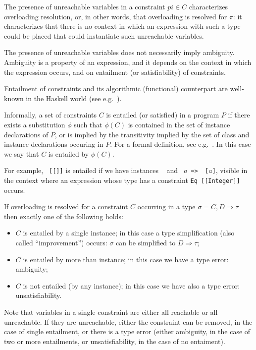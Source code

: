 The presence of unreachable variables in a constraint $pi\in C$
characterizes overloading resolution, or, in other words, that
overloading is resolved for $\pi$: it characterizes that there is no
context in which an expression with such a type could be placed that
could instantiate such unreachable variables.

The presence of unreachable variables does not necessarily imply
ambiguity. Ambiguity is a property of an expression, and it depends on
the context in which the expression occurs, and on entailment (or
satisfiability) of constraints.

Entailment of constraints and its algorithmic (functional) counterpart
are well-known in the Haskell world (see
e.g.~\cite{MarkJones94a,TheoryOfOverloading,JBCS-Ambiguity-and-constrained-polymorphism}).

Informally, a set of constraints $C$ is entailed (or satisfied) in a
program $P$ if there exists a substitution $\phi$ such that $\phi(C)$
is contained in the set of instance declarations of $P$, or is implied
by the transitivity implied by the set of class and instance
declarations occuring in $P$. For a formal definition, see
e.g.~\cite{MarkJones94a,JBCS-Ambiguity-and-constrained-polymorphism}. In
this case we say that $C$ is entailed by $\phi(C)$. 

For example, {\tt \Eq\ [[\Integer]]} is entailed if we have instances
{\tt \Eq\ \Integer} and {\tt \Eq\ $a$ => \Eq\ [$a$]}, visible in the
context where an expression whose type has a constraint {\tt Eq
  [[Integer]]} occurs.

If overloading is resolved for a constraint $C$ occurring in a type
$\sigma = C,D \Rightarrow \tau$ then exactly one of the following
holds:
\begin{itemize}

\item $C$ is entailed by a single instance; in this case a type
  simplification (also called ``improvement'') occurs: $\sigma$ can be
  simplified to $D \Rightarrow \tau$;

\item $C$ is entailed by more than instance; in this case we have a
  type error: ambiguity; 

\item $C$ is not entailed (by any instance); in this case we have also
  a type error: unsatisfiability.

\end{itemize}

Note that variables in a single constraint are either all reachable or
all unreachable. If they are unreachable, either the constraint can be
removed, in the case of single entailment, or there is a type error
(either ambiguity, in the case of two or more entailments, or
unsatisfiability, in the case of no entaiment).

